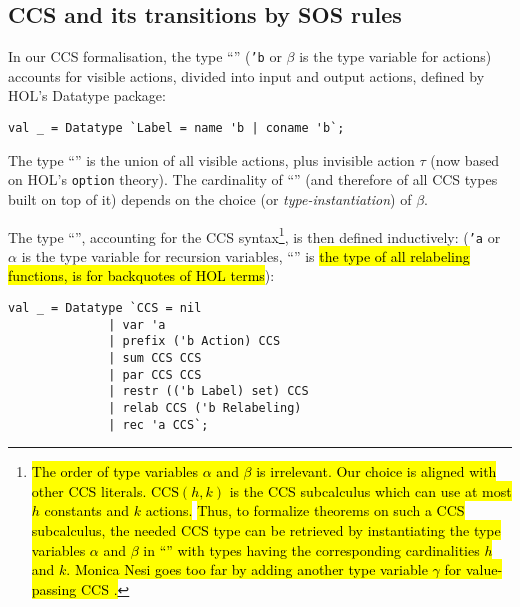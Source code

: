 
\subsection{CCS and its transitions by SOS rules}

In our CCS formalisation, the type ``'' (\texttt{'b} or
$\beta$ is the type variable for actions) accounts for visible actions, divided into input
and output actions, defined by HOL's Datatype package:
\begin{lstlisting}
val _ = Datatype `Label = name 'b | coname 'b`;
\end{lstlisting}
The type ``'' is the
union of all visible actions, plus invisible action $\tau$ (now based on
HOL's \texttt{option} theory). The cardinality of
``'' (and therefore of all
CCS types built on top of it)
 depends on the choice (or \emph{type-instantiation}) of $\beta$.

The type ``'', accounting for the CCS
syntax\footnote{\hl{The order of type variables $\alpha$ and $\beta$
    is irrelevant. Our choice is aligned with other CCS literals.
$\mathrm{CCS}(h,k)$ is the CCS subcalculus which can use at most $h$ constants
and $k$ actions.} \cite{gorrieri2017ccs} \hl{Thus, to formalize theorems on
such a CCS subcalculus, the needed CCS type can be retrieved by instantiating the type
variables $\alpha$ and $\beta$ in ``'' with types
having the corresponding cardinalities $h$ and $k$. Monica Nesi goes
too far by adding another type variable $\gamma$ for value-passing CCS \cite{Nesi:2017wo}.}}, is then defined inductively:
(\texttt{'a} or $\alpha$ is the type variable for recursion variables,
``'' is \hl{the type of all relabeling functions,
\mbox{} is for backquotes of HOL terms}):
\begin{lstlisting}
val _ = Datatype `CCS = nil
		      | var 'a
		      | prefix ('b Action) CCS
		      | sum CCS CCS
		      | par CCS CCS
		      | restr (('b Label) set) CCS
		      | relab CCS ('b Relabeling)
		      | rec 'a CCS`;
\end{lstlisting}

